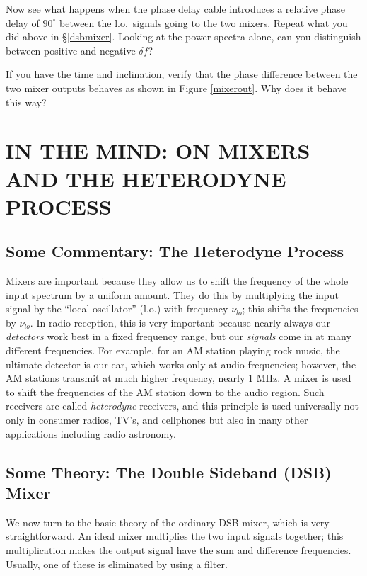 \documentclass[12pt,preprint]{aastex}
\begin{document}
Now see what happens when the phase delay cable introduces a relative
phase delay of $90^\circ$ between the l.o.\ signals going to the two
mixers.  Repeat what you did above in \S \ref{dsbmixer}. Looking at the
power spectra alone, can you distinguish between positive and negative
$\delta f$?

If you have the time and inclination, verify that the phase difference
between the two mixer outputs behaves as shown in Figure \ref{mixerout}.
Why does it behave this way?  

\section {IN THE MIND: ON MIXERS AND THE HETERODYNE
  PROCESS} \label{hetereo}

%
\subsection{Some Commentary: The Heterodyne Process}
%
Mixers are important because they allow us to shift the frequency of the
whole input spectrum by a uniform amount.  They do this by multiplying
the input signal by the ``local oscillator'' (l.o.) with frequency
$\nu_{lo}$; this shifts the frequencies by $\nu_{lo}$.  In radio
reception, this is very important because nearly always our {\it
  detectors} work best in a fixed frequency range, but our {\it signals}
come in at many different frequencies.  For example, for an AM station
playing rock music, the ultimate detector is our ear, which works only
at audio frequencies; however, the AM stations transmit at much higher
frequency, nearly 1 MHz.  A mixer is used to shift the frequencies of
the AM station down to the audio region.  Such receivers are called {\it
  heterodyne} receivers, and this principle is used universally not only
in consumer radios, TV's, and cellphones but also in many other
applications including radio astronomy.
%
\subsection { Some Theory: The Double Sideband (DSB) Mixer}
%
We now turn to the basic theory of the ordinary DSB mixer, which
is very straightforward.  An ideal mixer multiplies the two input
signals together; this multiplication makes the output signal have the
sum and difference frequencies.  Usually, one of these is eliminated by
using a filter.
\end{document}
